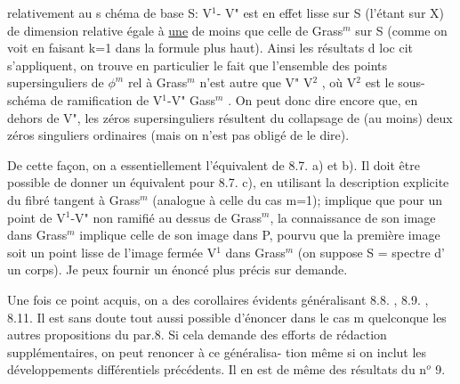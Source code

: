
relativement  au s chéma de base S:  V$^1$- V"  est en effet lisse sur S
(l'étant sur X)  de dimension relative égale à \uline{une} de moins que celle de
Grass$^m$ sur S  (comme on voit en faisant k=1 dans la formule plus haut).
Ainsi  les résultats d  loc cit  s'appliquent, on trouve en particulier
le fait que l'ensemble des points  supersinguliers  de $\phi^m$ rel à Grass$^m$
n'est autre que V" \hand{$\cup$} V$^2$ , où  V$^2$ est le sous-schéma de ramification
de  V$^1$-V" \hand{$\longrightarrow$} Gass$^m$ .  On peut donc dire encore que, en dehors de V", les
zéros supersinguliers résultent du collapsage de (au moins) deux zéros
singuliers ordinaires (mais on  n'est pas obligé de le dire\hand{)}).

 De cette façon, on a essentiellement l'équivalent de 8.7. a) et b). Il 
doit être possible de donner un équivalent pour  8.7. c), en  utilisant
la  description explicite du fibré tangent  à Grass$^m$ (analogue à
celle du cas m=1);   implique  que  pour  un point  de  V$^1$-V"  non
ramifié au dessus  de Grass$^m$, la connaissance de son image dans Grass$^m$
implique celle de son image dans P, pourvu que la première image soit un
point lisse de l'image fermée  V$^1$ dans Grass$^m$  (on suppose S = spectre d'
un corps).  Je peux fournir un énoncé  plus précis sur demande.

Une fois ce point acquis,  on a des corollaires évidents généralisant
8.8. , 8.9. , 8.11.   Il est sans doute tout aussi possible d'énoncer dans
le cas m quelconque  les autres propositions du par.8. Si cela demande des
efforts de rédaction  supplémentaires, on peut renoncer à ce généralisa-%
tion\hand{,}  même si on inclut les développements différentiels précédents.
Il en est de même des résultats du n$^o$ 9.

